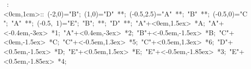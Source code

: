 
\hbox{
\xy    <1cm,0cm>:<0cm,1cm>::
       (-2,0)="B";  (1,0)="D" **\dir{-};  (-0.5,2.5)="A" **\dir{-};
       "B" **\dir{-}; (-0.5,0)="C"; "A" **\dir{-};    
       (-0.5, 1)="E"; "B"; **\dir{-}; "D" **\dir{-};
       "A"+<0em,1.5ex> *{A};  
                "A"+<-0.4em,-3ex> *{1}; "A"+<0.4em,-3ex> *{2}; 
       "B"+<-0.5em,-1.5ex> *{B};
       "C"+<0em,-1.5ex> *{C};
                "C"+<-0.5em,1.3ex> *{5}; "C"+<0.5em,1.3ex> *{6}; 
       "D"+<0.5em,-1.5ex> *{D};
       "E"+<0.5em,1.5ex> *{E};
                "E"+<-0.5em,-1.85ex> *{3}; "E"+<0.5em,-1.85ex> *{4}; 
       \endxy}
	   
